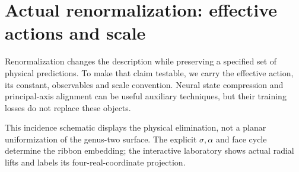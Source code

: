 \chapter{Actual renormalization: effective actions and scale}
\label{rg:chapter}
Renormalization changes the description while preserving a specified set of
physical predictions. To make that claim testable, we carry the effective
action, its constant, observables and scale convention. Neural state
compression and principal-axis alignment can be useful auxiliary techniques,
but their training losses do not replace these objects.

\begin{center}
\end{center}
This incidence schematic displays the physical elimination, not a planar
uniformization of the genus-two surface. The explicit $\sigma,\alpha $ and
face cycle determine the ribbon embedding; the interactive laboratory
shows actual radial lifts and labels its four-real-coordinate projection.

